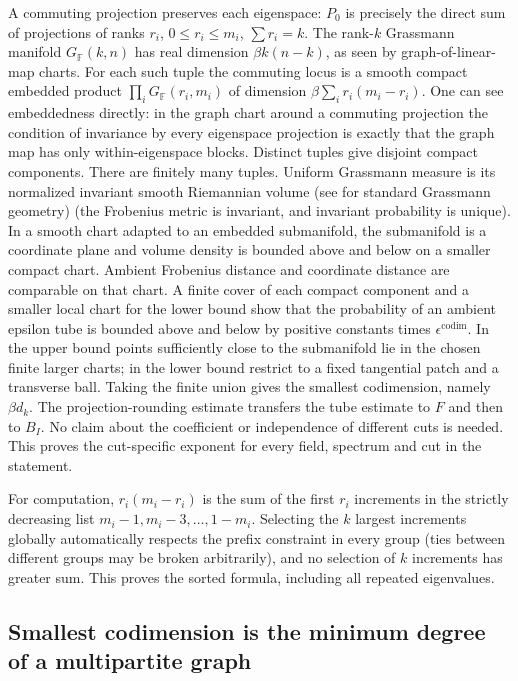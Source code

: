 \documentclass[11pt]{article}
\begin{document}
A commuting projection preserves each eigenspace: \(P_0\) is precisely the direct sum of projections of ranks \(r_i\), \(0\le r_i\le m_i\), \(\sum r_i=k\). The rank-\(k\) Grassmann manifold \(G_{\mathbb F}(k,n)\) has real dimension \(\beta k(n-k)\), as seen by graph-of-linear-map charts. For each such tuple the commuting locus is a smooth compact embedded product \(\prod_i G_{\mathbb F}(r_i,m_i)\) of dimension \(\beta\sum_i r_i(m_i-r_i)\). One can see embeddedness directly: in the graph chart around a commuting projection the condition of invariance by every eigenspace projection is exactly that the graph map has only within-eigenspace blocks. Distinct tuples give disjoint compact components. There are finitely many tuples. Uniform Grassmann measure is its normalized invariant smooth Riemannian volume (see \cite{Grassmann} for standard Grassmann geometry) (the Frobenius metric is invariant, and invariant probability is unique). In a smooth chart adapted to an embedded submanifold, the submanifold is a coordinate plane and volume density is bounded above and below on a smaller compact chart. Ambient Frobenius distance and coordinate distance are comparable on that chart. A finite cover of each compact component and a smaller local chart for the lower bound show that the probability of an ambient epsilon tube is bounded above and below by positive constants times \(\epsilon^{\mathrm{codim}}\). In the upper bound points sufficiently close to the submanifold lie in the chosen finite larger charts; in the lower bound restrict to a fixed tangential patch and a transverse ball. Taking the finite union gives the smallest codimension, namely \(\beta d_k\). The projection-rounding estimate transfers the tube estimate to \(F\) and then to \(B_I\). No claim about the coefficient or independence of different cuts is needed. This proves the cut-specific exponent for every field, spectrum and cut in the statement.

For computation, \(r_i(m_i-r_i)\) is the sum of the first \(r_i\) increments in the strictly decreasing list \(m_i-1,m_i-3,\ldots,1-m_i\). Selecting the \(k\) largest increments globally automatically respects the prefix constraint in every group (ties between different groups may be broken arbitrarily), and no selection of \(k\) increments has greater sum. This proves the sorted formula, including all repeated eigenvalues.

\subsection{Smallest codimension is the minimum degree of a multipartite graph}\label{smallest-codimension-is-the-minimum-degree-of-a-multipartite-graph}
\end{document}
